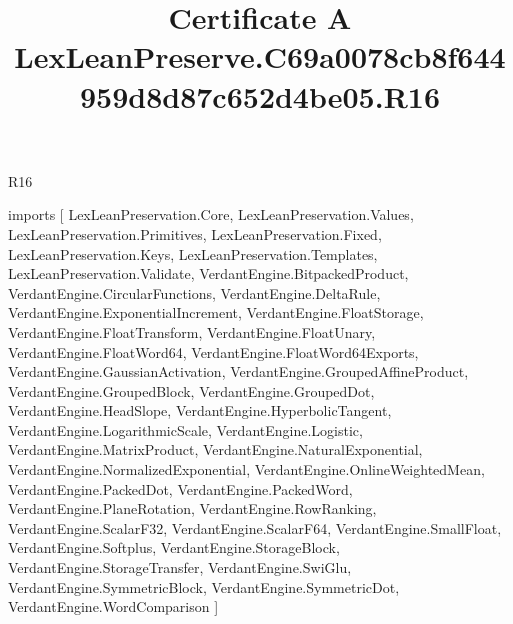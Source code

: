 \begin{lexlean}{R16}
\title{Certificate A LexLeanPreserve.C69a0078cb8f644959d8d87c652d4be05.R16}
\begin{coremodule}
imports [
  LexLeanPreservation.Core,
  LexLeanPreservation.Values,
  LexLeanPreservation.Primitives,
  LexLeanPreservation.Fixed,
  LexLeanPreservation.Keys,
  LexLeanPreservation.Templates,
  LexLeanPreservation.Validate,
  VerdantEngine.BitpackedProduct,
  VerdantEngine.CircularFunctions,
  VerdantEngine.DeltaRule,
  VerdantEngine.ExponentialIncrement,
  VerdantEngine.FloatStorage,
  VerdantEngine.FloatTransform,
  VerdantEngine.FloatUnary,
  VerdantEngine.FloatWord64,
  VerdantEngine.FloatWord64Exports,
  VerdantEngine.GaussianActivation,
  VerdantEngine.GroupedAffineProduct,
  VerdantEngine.GroupedBlock,
  VerdantEngine.GroupedDot,
  VerdantEngine.HeadSlope,
  VerdantEngine.HyperbolicTangent,
  VerdantEngine.LogarithmicScale,
  VerdantEngine.Logistic,
  VerdantEngine.MatrixProduct,
  VerdantEngine.NaturalExponential,
  VerdantEngine.NormalizedExponential,
  VerdantEngine.OnlineWeightedMean,
  VerdantEngine.PackedDot,
  VerdantEngine.PackedWord,
  VerdantEngine.PlaneRotation,
  VerdantEngine.RowRanking,
  VerdantEngine.ScalarF32,
  VerdantEngine.ScalarF64,
  VerdantEngine.SmallFloat,
  VerdantEngine.Softplus,
  VerdantEngine.StorageBlock,
  VerdantEngine.StorageTransfer,
  VerdantEngine.SwiGlu,
  VerdantEngine.SymmetricBlock,
  VerdantEngine.SymmetricDot,
  VerdantEngine.WordComparison
]


\end{coremodule}
\end{lexlean}
